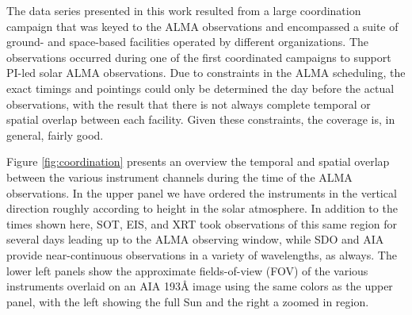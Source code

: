 \documentclass[twocolumn]{aastex62}
\begin{document}
The data series presented in this work resulted from a large coordination campaign that was keyed to the ALMA observations and encompassed a suite of ground- and space-based facilities operated by different organizations.
The observations occurred during one of the first coordinated campaigns to support PI-led solar ALMA observations. Due to constraints in the ALMA scheduling, the exact timings and pointings could only be determined the day before the actual observations, with the result that there is not always complete temporal or spatial overlap between each facility.  
Given these constraints, the coverage is, in general, fairly good.

Figure \ref{fig:coordination} presents an overview the temporal and spatial overlap between the various instrument channels during the time of the ALMA observations. 
In the upper panel we have ordered the instruments in the vertical direction roughly according to height in the solar atmosphere.
In addition to the times shown here, SOT, EIS, and XRT took observations of this same region for several days leading up to the ALMA observing window, while SDO and AIA provide near-continuous observations in a variety of wavelengths, as always.
The lower left panels show the approximate fields-of-view (FOV) of the various instruments overlaid on an AIA 193\AA{} image using the same colors as the upper panel, with the left showing the full Sun and the right a zoomed in region.
\end{document}

